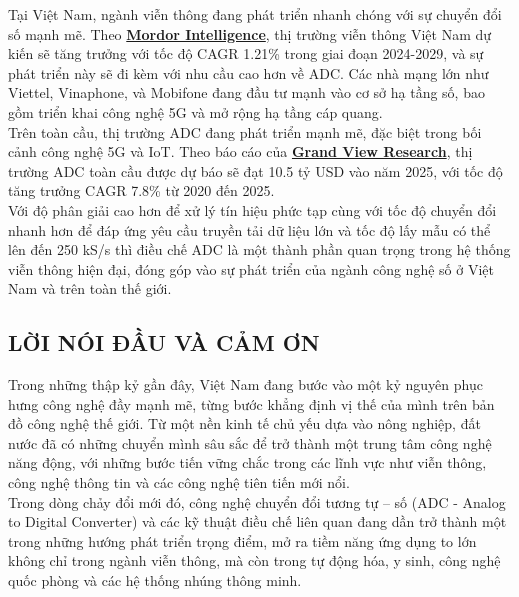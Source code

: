 \documentclass[a4paper,13pt]{article}
\begin{document}
Tại Việt Nam, ngành viễn thông đang phát triển nhanh chóng với sự chuyển đổi số mạnh mẽ. Theo \href{https://www.mordorintelligence.com/industry-reports/data-converter-market}{\textbf{ Mordor Intelligence}}, thị trường viễn thông Việt Nam dự kiến sẽ tăng trưởng với tốc độ CAGR 1.21\% trong giai đoạn 2024-2029, và sự phát triển này sẽ đi kèm với nhu cầu cao hơn về ADC. Các nhà mạng lớn như Viettel, Vinaphone, và Mobifone đang đầu tư mạnh vào cơ sở hạ tầng số, bao gồm triển khai công nghệ 5G và mở rộng hạ tầng cáp quang. \\

Trên toàn cầu, thị trường ADC đang phát triển mạnh mẽ, đặc biệt trong bối cảnh công nghệ 5G và IoT. Theo báo cáo của \href{https://www.grandviewresearch.com/industry-analysis/antibody-drug-conjugates-market}{\textbf{ Grand View Research}}, thị trường ADC toàn cầu được dự báo sẽ đạt 10.5 tỷ USD vào năm 2025, với tốc độ tăng trưởng CAGR 7.8\% từ 2020 đến 2025. \\

Với độ phân giải cao hơn để xử lý tín hiệu phức tạp cùng với tốc độ chuyển đổi nhanh hơn để đáp ứng yêu cầu truyền tải dữ liệu lớn và tốc độ lấy mẫu có thể lên đến 250 kS/s thì điều chế ADC là một thành phần quan trọng trong hệ thống viễn thông hiện đại, đóng góp vào sự phát triển của ngành công nghệ số ở Việt Nam và trên toàn thế giới.
\vspace{2cm}
\clearpage  

\begin{center}
\section{LỜI NÓI ĐẦU VÀ CẢM ƠN}
\end{center}

Trong những thập kỷ gần đây, Việt Nam đang bước vào một kỷ nguyên phục hưng công nghệ đầy mạnh mẽ, từng bước khẳng định vị thế của mình trên bản đồ công nghệ thế giới. Từ một nền kinh tế chủ yếu dựa vào nông nghiệp, đất nước đã có những chuyển mình sâu sắc để trở thành một trung tâm công nghệ năng động, với những bước tiến vững chắc trong các lĩnh vực như viễn thông, công nghệ thông tin và các công nghệ tiên tiến mới nổi.\\

Trong dòng chảy đổi mới đó, công nghệ chuyển đổi tương tự – số (ADC - Analog to Digital Converter) và các kỹ thuật điều chế liên quan đang dần trở thành một trong những hướng phát triển trọng điểm, mở ra tiềm năng ứng dụng to lớn không chỉ trong ngành viễn thông, mà còn trong tự động hóa, y sinh, công nghệ quốc phòng và các hệ thống nhúng thông minh. \\
\end{document}
